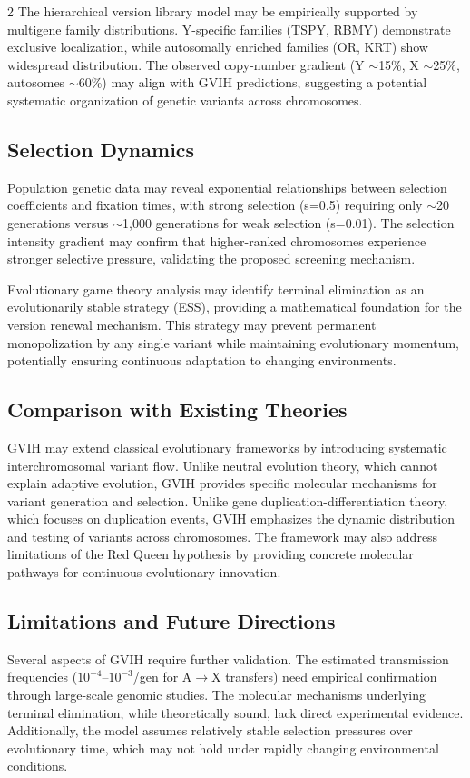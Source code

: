\documentclass{base}
\begin{document}
\begin{multicols}{2}
The hierarchical version library model may be empirically supported by multigene family distributions. Y-specific families (TSPY, RBMY) demonstrate exclusive localization, while autosomally enriched families (OR, KRT) show widespread distribution. The observed copy-number gradient (Y $\sim$15\%, X $\sim$25\%, autosomes $\sim$60\%) may align with GVIH predictions, suggesting a potential systematic organization of genetic variants across chromosomes.

\subsection{Selection Dynamics}
Population genetic data may reveal exponential relationships between selection coefficients and fixation times, with strong selection (s=0.5) requiring only $\sim$20 generations versus $\sim$1,000 generations for weak selection (s=0.01). The selection intensity gradient may confirm that higher-ranked chromosomes experience stronger selective pressure, validating the proposed screening mechanism.

Evolutionary game theory analysis may identify terminal elimination as an evolutionarily stable strategy (ESS), providing a mathematical foundation for the version renewal mechanism. This strategy may prevent permanent monopolization by any single variant while maintaining evolutionary momentum, potentially ensuring continuous adaptation to changing environments.

\subsection{Comparison with Existing Theories}
GVIH may extend classical evolutionary frameworks by introducing systematic interchromosomal variant flow. Unlike neutral evolution theory, which cannot explain adaptive evolution, GVIH provides specific molecular mechanisms for variant generation and selection. Unlike gene duplication-differentiation theory, which focuses on duplication events, GVIH emphasizes the dynamic distribution and testing of variants across chromosomes. The framework may also address limitations of the Red Queen hypothesis by providing concrete molecular pathways for continuous evolutionary innovation.

\subsection{Limitations and Future Directions}
Several aspects of GVIH require further validation. The estimated transmission frequencies ($10^{-4}$--$10^{-3}$/gen for A$\rightarrow$X transfers) need empirical confirmation through large-scale genomic studies. The molecular mechanisms underlying terminal elimination, while theoretically sound, lack direct experimental evidence. Additionally, the model assumes relatively stable selection pressures over evolutionary time, which may not hold under rapidly changing environmental conditions.


\end{multicols}
\end{document}
